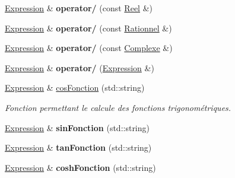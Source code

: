 \begin{DoxyCompactItemize}
\item 
\hypertarget{class_expression_abf12b51b3587e7dec24ab1d8a218a251}{\hyperlink{class_expression}{Expression} \& {\bfseries operator/} (const \hyperlink{class_reel}{Reel} \&)}\label{class_expression_abf12b51b3587e7dec24ab1d8a218a251}

\item 
\hypertarget{class_expression_aac26e92c371f49f8a581ebfd1223dd4a}{\hyperlink{class_expression}{Expression} \& {\bfseries operator/} (const \hyperlink{class_rationnel}{Rationnel} \&)}\label{class_expression_aac26e92c371f49f8a581ebfd1223dd4a}

\item 
\hypertarget{class_expression_ae75f2ec143a40d53ee1b7fa1c1f7c80f}{\hyperlink{class_expression}{Expression} \& {\bfseries operator/} (const \hyperlink{class_complexe}{Complexe} \&)}\label{class_expression_ae75f2ec143a40d53ee1b7fa1c1f7c80f}

\item 
\hypertarget{class_expression_afdf66c304b67b599336d832b2dde2f92}{\hyperlink{class_expression}{Expression} \& {\bfseries operator/} (\hyperlink{class_expression}{Expression} \&)}\label{class_expression_afdf66c304b67b599336d832b2dde2f92}

\item 
\hyperlink{class_expression}{Expression} \& \hyperlink{class_expression_abd5043859ed768c2230a5296f5ca1020}{cos\-Fonction} (std\-::string)
\begin{DoxyCompactList}\small\item\em Fonction permettant le calcule des fonctions trigonométriques. \end{DoxyCompactList}\item 
\hypertarget{class_expression_a344158f97bc06689c458000eea5743e1}{\hyperlink{class_expression}{Expression} \& {\bfseries sin\-Fonction} (std\-::string)}\label{class_expression_a344158f97bc06689c458000eea5743e1}

\item 
\hypertarget{class_expression_a1fa57ac3a29bdb723371de604cfb5bdc}{\hyperlink{class_expression}{Expression} \& {\bfseries tan\-Fonction} (std\-::string)}\label{class_expression_a1fa57ac3a29bdb723371de604cfb5bdc}

\item 
\hypertarget{class_expression_a23e005f6f25a9768302a1337c4f074f1}{\hyperlink{class_expression}{Expression} \& {\bfseries cosh\-Fonction} (std\-::string)}\label{class_expression_a23e005f6f25a9768302a1337c4f074f1}


\end{DoxyCompactItemize}
